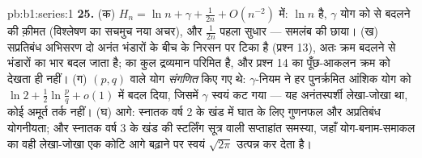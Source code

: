 \begin{solution}{pb:b1:series:1}
\textbf{25.} (क) $H_n = \ln n + \gamma + \frac{1}{2n} + O(n^{-2})$ में: $\ln
n$  है, $\gamma$ योग को  से बदलने की क़ीमत (विश्लेषण का सचमुच नया
अचर), और $\frac{1}{2n}$ पहला सुधार --- समलंब की छाया। (ख) सप्रतिबंध अभिसरण
दो अनंत भंडारों के बीच के निरसन पर टिका है (प्रश्न 13), अतः क्रम बदलने से
भंडारों का भार बदल जाता है;  का कुल द्रव्यमान परिमित है, और
प्रश्न 14 का पूँछ-आकलन क्रम को देखता ही नहीं। (ग) $(p,q)$ वाले योग
\emph{संगणित} किए गए थे: $\gamma$-नियम ने हर पुनर्क्रमित आंशिक योग को $\ln 2
+ \frac12\ln\frac pq + o(1)$ में बदल दिया, जिसमें $\gamma$ स्वयं कट गया ---
यह अनंतस्पर्शी लेखा-जोखा था, कोई अमूर्त तर्क नहीं। (घ) आगे: स्नातक वर्ष 2 के
खंड में घात  के लिए गुणनफल और अप्रतिबंध योगनीयता; और स्नातक वर्ष 3 के
खंड की स्टर्लिंग सूत्र वाली सप्ताहांत समस्या, जहाँ योग-बनाम-समाकल का वही
लेखा-जोखा एक कोटि आगे बढ़ाने पर स्वयं $\sqrt{2\pi}$ उत्पन्न कर देता है।
\end{solution}
